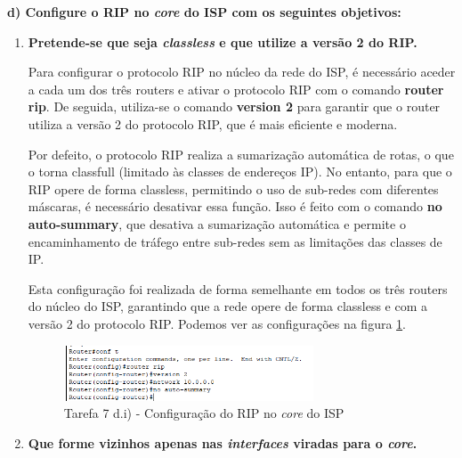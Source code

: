 \documentclass[11pt,english, openright, oneside]{book}
\begin{document}
\vspace{0.8cm}

\textbf{d) Configure o RIP no \textit{core} do ISP com os seguintes objetivos: }
\begin{enumerate}[label=\Roman*.]
    \item \textbf{Pretende-se que seja \textit{classless} e que utilize a versão 2 do RIP.}
    \vspace{0.2cm}

    Para configurar o protocolo RIP no núcleo da rede do ISP, é necessário aceder a cada um dos três routers e ativar o protocolo RIP com o comando \textbf{router rip}. De seguida, utiliza-se o comando \textbf{version 2} para garantir que o router utiliza a versão 2 do protocolo RIP, que é mais eficiente e moderna.

    \par Por defeito, o protocolo RIP realiza a sumarização automática de rotas, o que o torna classfull (limitado às classes de endereços IP). No entanto, para que o RIP opere de forma classless, permitindo o uso de sub-redes com diferentes máscaras, é necessário desativar essa função. Isso é feito com o comando \textbf{no auto-summary}, que desativa a sumarização automática e permite o encaminhamento de tráfego entre sub-redes sem as limitações das classes de IP.

    \par Esta configuração foi realizada de forma semelhante em todos os três routers do núcleo do ISP, garantindo que a rede opere de forma classless e com a versão 2 do protocolo RIP. Podemos ver as configurações na figura \ref{fig:7.d.i}.
    \vspace{0.2cm}

    \begin{figure}[H]
        \centering
        \includegraphics[width=0.7\textwidth]{imagens/Tarefa7/7.d_1.png}
        \caption{Tarefa 7 d.i) - Configuração do RIP no \textit{core} do ISP}
        \label{fig:7.d.i}
    \end{figure}
    

    \vspace{0.4cm}

    \item \textbf{Que forme vizinhos apenas nas \textit{interfaces} viradas para o \textit{core}.}
    \vspace{0.2cm}


\end{enumerate}
\end{document}
